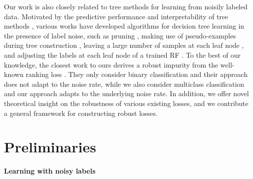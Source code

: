 \documentclass[letterpaper]{article} %
\begin{document}
Our work is also closely related to tree methods for learning from noisily
labeled data.
Motivated by the predictive performance and interpretability of tree methods
\cite{breiman1984classification,breiman2001random,geurts2006extremely},
various works have developed algorithms for decision tree learning in the
presence of label noise, such as pruning \cite{breiman1984classification},
making use of pseudo-examples during tree construction \cite{mantas2014credal},
leaving a large number of samples at each leaf node \cite{ghosh2017robustness},
and adjusting the labels at each leaf node of a trained RF \cite{zhou2019improving}.
To the best of our knowledge, the closest work to ours derives a robust impurity
from the well-known ranking loss \cite{yang2019robust}.
They only consider binary classification and their approach does not adapt to
the noise rate, while we also consider multiclass classification and our
approach adapts to the underlying noise rate.
In addition, we offer novel theoretical insight on the robustness of various
existing losses, and we contribute a general framework for constructing robust
losses.




\section{Preliminaries}\label{sec:background}

\paragraph{Learning with noisy labels}
\end{document}
